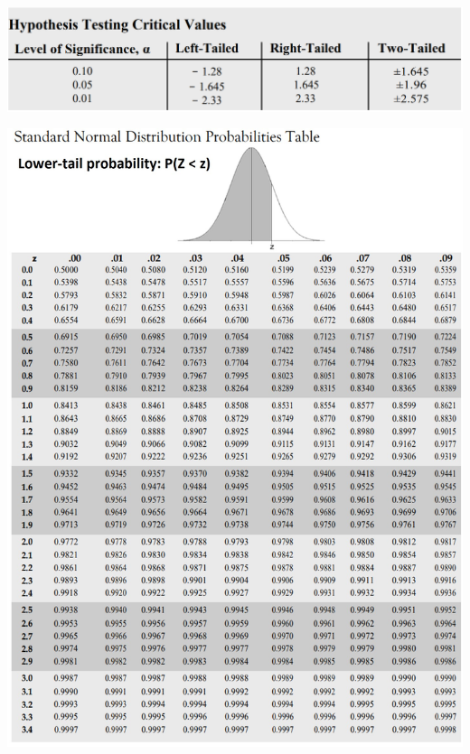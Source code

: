 \documentclass[12pt, landscape]{article}
\begin{document}
\begin{multicols*}{3}
\centerline{\includegraphics[width=0.8\linewidth]{criticalvalues2}}

\null
\columnbreak

\smallskip
\centerline{\includegraphics[width=1\linewidth]{criticals2}}


\end{multicols*}
\end{document}
